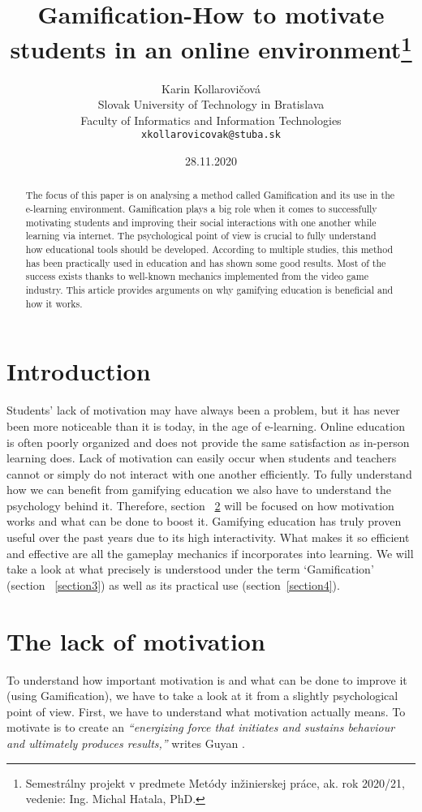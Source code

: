 \documentclass[10pt,english,a4paper]{article}
\title{Gamification-How to motivate students in an online environment\thanks{Semestrálny projekt v predmete Metódy inžinierskej práce, ak. rok 2020/21, vedenie: Ing. Michal Hatala, PhD.}}
\author{Karin Kollarovičová\\[2pt]
	{\small Slovak University of Technology in Bratislava}\\
	{\small Faculty of Informatics and Information Technologies}\\
	{\small \texttt{xkollarovicovak@stuba.sk}}
	}
\date{\small 28.11.2020}
\begin{document}
\maketitle

\begin{abstract}
	The focus of this paper is on analysing a method called Gamification and its use in the e-learning environment. 
	Gamification plays a big role when it comes to successfully motivating students and improving their social interactions with one another while learning via internet. 
	The psychological point of view is crucial to fully understand how educational tools should be developed. 
	According to multiple studies, this method has been practically used in education and has shown some good results. 
	Most of the success exists thanks to well-known mechanics implemented from the video game industry. 
	This article provides arguments on why gamifying education is beneficial and how it works. 
\end{abstract}



\section{Introduction} \label{introduction}
	Students’ lack of motivation may have always been a problem, but it has never been more noticeable than it is today, in the age of e-learning. 
	Online education is often poorly organized and does not provide the same satisfaction as in-person learning does.
	Lack of motivation can easily occur when students and teachers cannot or simply do not interact with one another efficiently. To fully understand how we can benefit from gamifying education we also have to understand the psychology behind it. 
	Therefore, section ~\ref{section2} will be focused on how motivation works and what can be done to boost it.
	Gamifying education has truly proven useful over the past years due to its high interactivity. What makes it so efficient and effective are all the gameplay mechanics if incorporates into learning.
	We will take a look at what precisely is understood under the term ‘Gamification’ (section ~\ref{section3}) as well as its practical use (section~\ref{section4}).

\section{The lack of motivation} \label{section2}
	To understand how important motivation is and what can be done to improve it (using Gamification), we have to take a look at it from a slightly psychological point of view. First, we have to understand what motivation actually means. 
	To motivate is to create an \textit{“energizing force that initiates and sustains behaviour and ultimately produces results,”} writes Guyan \cite{Guyan}. 
\end{document}
